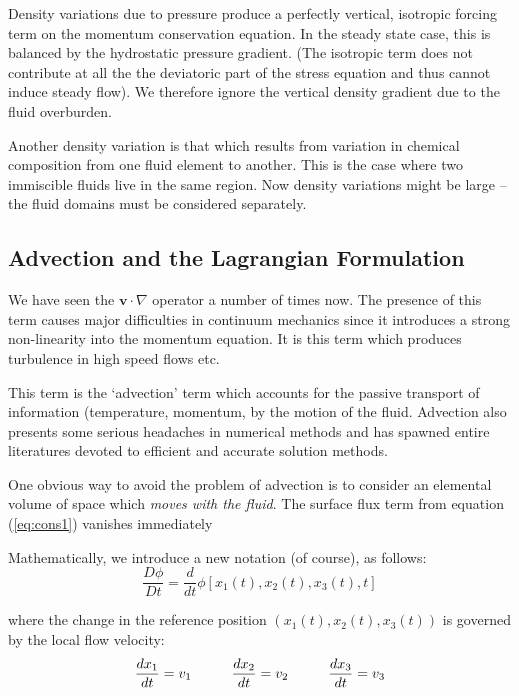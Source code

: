 \documentclass[10pt]{article}
\begin{document}
	Density variations due to pressure produce a perfectly vertical, isotropic
	forcing term on the momentum conservation equation. In the steady
	state case, this is balanced 
	by the hydrostatic pressure gradient. (The isotropic term does not
	contribute at all the the deviatoric part of the stress equation and thus
	cannot induce steady flow). We therefore ignore the vertical density
	gradient due to the fluid overburden.
	
	Another density variation is that which results from 
	variation in chemical composition from one fluid element to
	another. This is the case where two immiscible fluids live in
	the same region. Now density variations might be large -- the
	fluid domains must be considered separately.
	
\subsection{Advection and the Lagrangian  Formulation}
	
	We have seen the $\mathbf{v} \cdot \nabla$ operator a number of times now.
	The presence of this term causes major difficulties in continuum mechanics since
	it introduces a strong non-linearity into the momentum equation. It is this
	term which produces turbulence in high speed flows etc.
	
	This term is the `advection' term which accounts for the passive transport of
	information (temperature, momentum, by the motion of the fluid. Advection
	also presents some serious headaches in numerical methods and has spawned
	entire literatures devoted to efficient and accurate solution methods.
	
	One obvious way to avoid the problem of advection is to consider an elemental
	volume of space which {\em moves with the fluid}. The surface flux term from 
	equation (\ref{eq:cons1}) vanishes immediately
	
	Mathematically, we introduce a new notation (of course), as follows:
		\begin{equation}
			\frac{D \phi}{D t} = \frac{d}{dt} \phi[x_1(t),x_2(t),x_3(t),t]
		\end{equation}
	
 	where the change in the reference position $(x_1(t),x_2(t),x_3(t))$ is 
 	governed by the local flow velocity:
 		\begin{equation}
 					\frac{d x_1}{d t} = v_1 \mbox{\hspace{1cm}}
 					\frac{d x_2}{d t} = v_2 \mbox{\hspace{1cm}}
 					\frac{d x_3}{d t} = v_3
		\end{equation}
		
\end{document}
